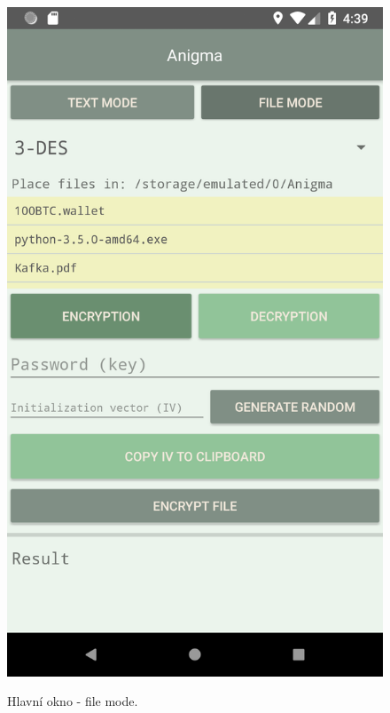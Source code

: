 \documentclass[12pt, a4paper]{article}
\begin{document}
\begin{figure}[h]
\caption{Hlavní okno - file mode.}
\centering
\includegraphics[height=0.4\textheight]{file}
\label{fig:file}
\end{figure}
\end{document}

